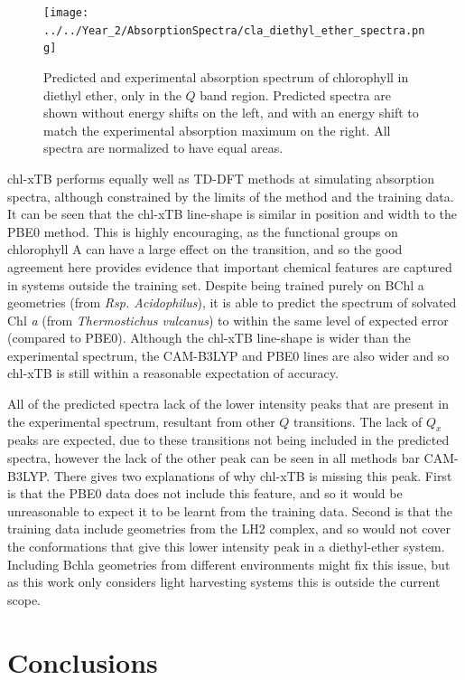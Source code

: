 \begin{figure}
    \centering
    \texttt{[image: ../../Year\_2/AbsorptionSpectra/cla\_diethyl\_ether\_spectra.png]}
    \caption{Predicted and experimental absorption spectrum of chlorophyll in diethyl 
    ether, only in the $Q$ band region. Predicted spectra are shown without energy
    shifts on the left, and with an energy shift to match the experimental absorption
    maximum on the right. All spectra are normalized to have equal areas.}
    \label{fig:chl_diethyl_ether}
\end{figure}

chl-xTB performs equally well as TD-DFT methods at simulating absorption spectra,
although constrained by the limits of the method and the training data. It can be
seen that the chl-xTB line-shape is similar in position and width to the PBE0 method.
This is highly encouraging, as the functional groups on chlorophyll A can have a
large effect on the \Qy transition, and so the good agreement here provides evidence
that important chemical features are captured in systems outside the training set.
Despite being trained purely on BChl a geometries (from \emph{Rsp. Acidophilus}),
it is able to predict the spectrum of solvated Chl \emph{a} (from \emph{Thermostichus vulcanus})
to within the same level of expected error (compared to PBE0). Although the chl-xTB
line-shape is wider than the experimental spectrum, the CAM-B3LYP and PBE0 lines
are also wider and so chl-xTB is still within a reasonable expectation of accuracy.

All of the predicted spectra lack of the lower intensity peaks that are present 
in the experimental spectrum, resultant from other $Q$ transitions. The lack of $Q_x$ 
peaks are expected, due to these transitions not being included in the predicted 
spectra, however the lack of the other \Qy peak can be seen in all methods bar CAM-B3LYP.
There gives two explanations of why chl-xTB is missing this peak. First is that the
PBE0 data does not include this feature, and so it would be unreasonable to expect
it to be learnt from the training data. Second is that the training data include 
geometries from the LH2 complex, and so would not cover the conformations that give
this lower intensity peak in a diethyl-ether system. Including Bchla geometries
from different environments might fix this issue, but as this work only considers
light harvesting systems this is outside the current scope.

\section{Conclusions}
\label{sec:chl_conclusions}

